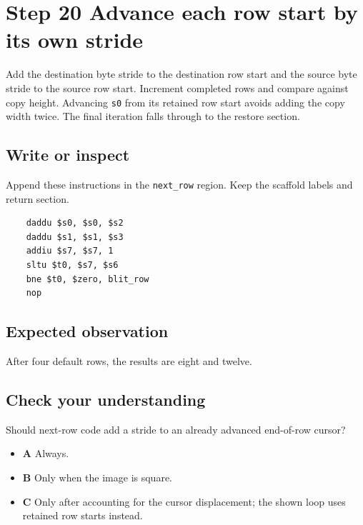 \section{Step 20 Advance each row start by its own stride}\label{blit-s20}

Add the destination byte stride to the destination row start and the source byte stride to the source row start. Increment completed rows and compare against copy height. Advancing \texttt{s0} from its retained row start avoids adding the copy width twice. The final iteration falls through to the restore section.

\subsection{Write or inspect}
Append these instructions in the \texttt{next\_row} region. Keep the scaffold labels and return section.

\begin{verbatim}
    daddu $s0, $s0, $s2
    daddu $s1, $s1, $s3
    addiu $s7, $s7, 1
    sltu $t0, $s7, $s6
    bne $t0, $zero, blit_row
    nop
\end{verbatim}

\subsection{Expected observation}
After four default rows, the results are eight and twelve.

\subsection{Check your understanding}
Should next-row code add a stride to an already advanced end-of-row cursor?

\begin{itemize}
  \item \textbf{A} Always.
  \item \textbf{B} Only when the image is square.
  \item \textbf{C} Only after accounting for the cursor displacement; the shown loop uses retained row starts instead.
\end{itemize}
